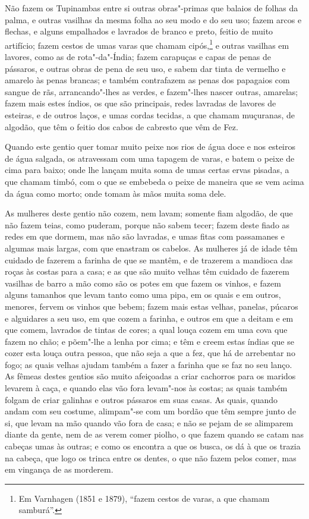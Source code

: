 Não fazem os Tupinambas entre si outras obras"-primas que balaios de folhas da palma, e
outras vasilhas da mesma folha ao seu modo e do seu uso; fazem arcos e flechas, e alguns
empalhados e lavrados de branco e preto, feitio de muito artifício; fazem cestos de umas
varas que chamam cipós,\footnote{ Em Varnhagen (1851 e 1879), ``fazem cestos de varas, a
que chamam samburá''.} e outras vasilhas em lavores, como as de rota"-da"-Índia; fazem
carapuças e capas de penas de pássaros, e outras obras de pena de seu uso, e sabem dar
tinta de vermelho e amarelo às penas brancas; e também contrafazem as penas dos papagaios
com sangue de rãs, arrancando"-lhes as verdes, e fazem"-lhes nascer outras, amarelas; fazem
mais estes índios, os que são principais, redes lavradas de lavores de esteiras, e de
outros laços, e umas cordas tecidas, a que chamam muçuranas, de algodão, que têm o feitio
dos cabos de cabresto que vêm de Fez.

Quando este gentio quer tomar muito peixe nos rios de água doce e nos esteiros de água
salgada, os atravessam com uma tapagem de varas, e batem o peixe de cima para baixo; onde
lhe lançam muita soma de umas certas ervas pisadas, a que chamam timbó, com o que se
embebeda o peixe de maneira que se vem acima da água como morto; onde tomam às mãos muita
soma dele.

As mulheres deste gentio não cozem, nem lavam; somente fiam algodão, de que não fazem
teias, como puderam, porque não sabem tecer; fazem deste fiado as redes em que dormem, mas
não são lavradas, e umas fitas com passamanes e algumas mais largas, com que enastram os
cabelos. As mulheres já de idade têm cuidado de fazerem a farinha de que se mantêm, e de
trazerem a mandioca das roças às costas para a casa; e as que são muito velhas têm cuidado
de fazerem vasilhas de barro a mão como são os potes em que fazem os vinhos, e fazem
alguns tamanhos que levam tanto como uma pipa, em os quais e em outros, menores, fervem os
vinhos que bebem; fazem mais estas velhas, panelas, púcaros e alguidares a seu uso, em que
cozem a farinha, e outros em que a deitam e em que comem, lavrados de tintas de cores; a
qual louça cozem em uma cova que fazem no chão; e põem"-lhe a lenha por cima; e têm e creem
estas índias que se cozer esta louça outra pessoa, que não seja a que a fez, que há de
arrebentar no fogo; as quais velhas ajudam também a fazer a farinha que se faz no seu
lanço. As fêmeas destes gentios são muito afeiçoadas a criar cachorros para os maridos
levarem à caça, e quando elas vão fora levam"-nos às costas; as quais também folgam de
criar galinhas e outros pássaros em suas casas. As quais, quando andam com seu costume,
alimpam"-se com um bordão que têm sempre junto de si, que levam na mão quando vão fora de
casa; e não se pejam de se alimparem diante da gente, nem de as verem comer piolho, o que
fazem quando se catam nas cabeças umas às outras; e como os encontra a que os busca, os dá
à que os trazia na cabeça, que logo os trinca entre os dentes, o que não fazem pelos
comer, mas em vingança de as morderem.

